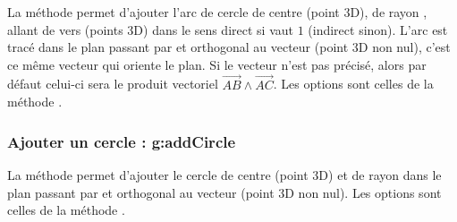 La méthode  permet d'ajouter l'arc de cercle de centre  (point 3D), de rayon , allant de  vers  (points 3D) dans le sens direct si  vaut $1$ (indirect sinon). L'arc est tracé dans le plan passant par  et orthogonal au vecteur (point 3D non nul), c'est ce même vecteur qui oriente le plan. Si le vecteur  n'est pas précisé, alors par défaut celui-ci sera le produit vectoriel $\vec{AB}\wedge\vec{AC}$. Les options sont celles de la méthode .

\subsubsection{Ajouter un cercle : g:addCircle}

La méthode  permet d'ajouter le cercle de centre  (point 3D) et de rayon  dans le plan passant par  et orthogonal au vecteur (point 3D non nul). Les options sont celles de la méthode .

